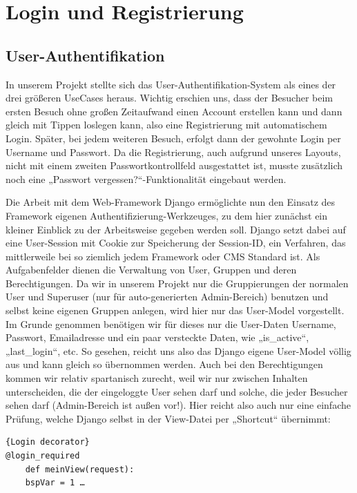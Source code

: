 \documentclass[titlepage, 12pt,a4paper]{scrartcl}
\begin{document}
\section{Login und Registrierung}\label{registrierung}
\subsection{User-Authentifikation}
In unserem Projekt stellte sich das User-Authentifikation-System als eines der
drei größeren UseCases heraus. Wichtig erschien uns, dass der Besucher beim 
ersten Besuch ohne großen Zeitaufwand einen Account erstellen kann und dann 
gleich mit Tippen loslegen kann, also eine Registrierung mit automatischem 
Login. Später, bei jedem weiteren Besuch, erfolgt dann der gewohnte Login per 
Username und Passwort. Da die Registrierung, auch aufgrund unseres Layouts, 
nicht mit einem zweiten Passwortkontrollfeld ausgestattet ist, musste
zusätzlich noch eine „Passwort vergessen?“-Funktionalität eingebaut werden.

Die Arbeit mit dem Web-Framework Django ermöglichte nun den Einsatz des 
Framework eigenen Authentifizierung-Werkzeuges, zu dem hier zunächst ein
kleiner Einblick zu der Arbeitsweise gegeben werden soll. Django setzt dabei
auf eine User-Session mit Cookie zur Speicherung der Session-ID, ein Verfahren,
das mittlerweile bei so ziemlich jedem Framework oder CMS Standard ist. Als 
Aufgabenfelder dienen die Verwaltung von User, Gruppen und deren
Berechtigungen. Da wir in unserem Projekt nur die Gruppierungen der normalen 
User und Superuser (nur für auto-generierten Admin-Bereich) benutzen und selbst
keine eigenen Gruppen anlegen, wird hier nur das User-Model vorgestellt. Im
Grunde genommen benötigen wir für dieses nur die User-Daten Username, Passwort,
Emailadresse und ein paar versteckte Daten, wie „is\_active“, „last\_login“,
etc. So gesehen, reicht uns also das Django eigene User-Model völlig aus und 
kann gleich so übernommen werden. Auch bei den Berechtigungen kommen wir relativ 
spartanisch zurecht, weil wir nur zwischen Inhalten unterscheiden, die der 
eingeloggte User sehen darf und solche, die jeder Besucher sehen darf 
(Admin-Bereich ist außen vor!). Hier reicht also auch nur eine einfache
Prüfung,  welche Django selbst in der View-Datei per „Shortcut“ übernimmt:

\begin{lstlisting}[caption=Hibernate]{Login decorator}
@login_required
    def meinView(request):
    bspVar = 1 …
\end{lstlisting}
\end{document}
